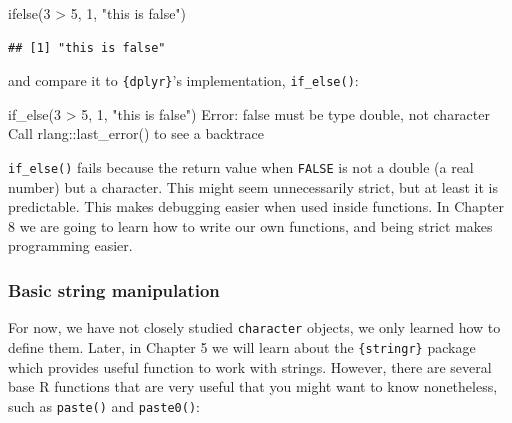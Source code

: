 \documentclass[
]{article}
\newenvironment{Shaded}{\begin{snugshade}}{\end{snugshade}}
\newcommand{\AttributeTok}[1]{\textcolor[rgb]{0.77,0.63,0.00}{#1}}
\newcommand{\DecValTok}[1]{\textcolor[rgb]{0.00,0.00,0.81}{#1}}
\newcommand{\FunctionTok}[1]{\textcolor[rgb]{0.00,0.00,0.00}{#1}}
\newcommand{\NormalTok}[1]{#1}
\newcommand{\SpecialCharTok}[1]{\textcolor[rgb]{0.00,0.00,0.00}{#1}}
\newcommand{\StringTok}[1]{\textcolor[rgb]{0.31,0.60,0.02}{#1}}
\begin{document}
\begin{Shaded}
\begin{Highlighting}[]
\FunctionTok{ifelse}\NormalTok{(}\DecValTok{3} \SpecialCharTok{\textgreater{}} \DecValTok{5}\NormalTok{, }\DecValTok{1}\NormalTok{, }\StringTok{"this is false"}\NormalTok{)}
\end{Highlighting}
\end{Shaded}

\begin{verbatim}
## [1] "this is false"
\end{verbatim}

and compare it to \texttt{\{dplyr\}}'s implementation, \texttt{if\_else()}:

\begin{Shaded}
\begin{Highlighting}[]
\FunctionTok{if\_else}\NormalTok{(}\DecValTok{3} \SpecialCharTok{\textgreater{}} \DecValTok{5}\NormalTok{, }\DecValTok{1}\NormalTok{, }\StringTok{"this is false"}\NormalTok{)}
\NormalTok{Error}\SpecialCharTok{:} \StringTok{\textasciigrave{}}\AttributeTok{false}\StringTok{\textasciigrave{}}\NormalTok{ must be type double, not character}
\NormalTok{Call }\StringTok{\textasciigrave{}}\AttributeTok{rlang::last\_error()}\StringTok{\textasciigrave{}}\NormalTok{ to see a backtrace}
\end{Highlighting}
\end{Shaded}

\texttt{if\_else()} fails because the return value when \texttt{FALSE} is not a double (a real number) but a character. This might seem unnecessarily
strict, but at least it is predictable. This makes debugging easier when used inside functions. In Chapter 8 we are going to learn how
to write our own functions, and being strict makes programming easier.

\hypertarget{basic-string-manipulation}{%
\subsubsection{Basic string manipulation}\label{basic-string-manipulation}}

For now, we have not closely studied \texttt{character} objects, we only learned how to define them. Later, in Chapter 5 we will learn about the
\texttt{\{stringr\}} package which provides useful function to work with strings. However, there are several base R functions that are very
useful that you might want to know nonetheless, such as \texttt{paste()} and \texttt{paste0()}:
\end{document}
